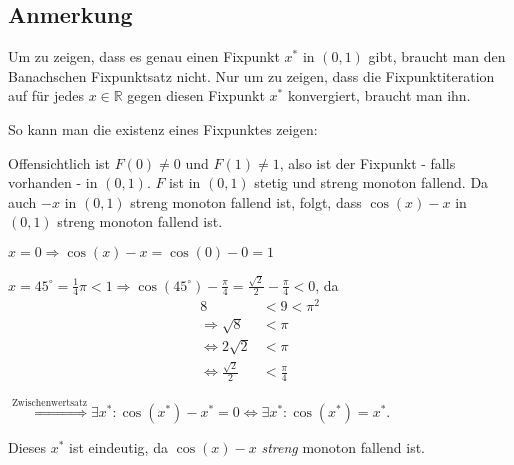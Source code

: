 \subsection*{Anmerkung}
Um zu zeigen, dass es genau einen Fixpunkt $x^*$ in $(0,1)$ gibt, 
braucht man den Banachschen Fixpunktsatz nicht. Nur um zu zeigen, 
dass die Fixpunktiteration auf für jedes $x \in \mathbb{R}$ gegen
diesen Fixpunkt $x^*$ konvergiert, braucht man ihn.

So kann man die existenz eines Fixpunktes zeigen:

Offensichtlich ist $F(0) \neq 0$ und $F(1) \neq 1$, also ist der 
Fixpunkt - falls vorhanden - in $(0,1)$. $F$ ist in $(0,1)$ stetig
und streng monoton fallend. Da auch $-x$ in $(0,1)$ streng monoton
fallend ist, folgt, dass $\cos(x) - x$ in $(0,1)$ streng monoton 
fallend ist.

$x=0 \Rightarrow \cos(x) - x = \cos(0) - 0 = 1$

$x=45^\circ = \frac{1}{4} \pi < 1 \Rightarrow \cos(45^\circ) - \frac{\pi}{4} = \frac{\sqrt{2}}{2} - \frac{\pi}{4} <0$, da
\begin{align}
    8 &< 9 < \pi^2\\
    \Rightarrow \sqrt{8} &< \pi\\
    \Leftrightarrow 2 \sqrt{2} &< \pi\\
    \Leftrightarrow \frac{\sqrt{2}}{2} &< \frac{\pi}{4}
\end{align}

$\stackrel{\text{Zwischenwertsatz}}{\Rightarrow} \exists x^*: \cos(x^*) - x^* = 0 \Leftrightarrow \exists x^*: \cos(x^*) = x^*$.

Dieses $x^*$ ist eindeutig, da $\cos(x)-x$ \emph{streng} monoton fallend ist.
